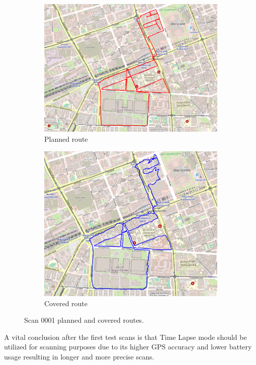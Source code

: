 \documentclass[a4paper,12pt]{article}
\begin{document}
\begin{enumerate}
\begin{figure}[H]
\begin{subfigure}{.88\textwidth}
			\includegraphics[width=1\linewidth]{route_p1}
			\caption{Planned route}
			\label{fig:a1}
		\end{subfigure}%
		\linebreak
		\begin{subfigure}{.88\textwidth}
			\centering
			\includegraphics[width=1\linewidth]{route_c1}
			\caption{Covered route}
			\label{fig:b1}
		\end{subfigure}
		\caption{Scan 0001 planned and covered routes.}
		\label{fig:fig1}
	\end{figure}
\end{enumerate}
A vital conclusion after the first test scans is that Time Lapse mode should be utilized for scanning purposes due to its higher GPS accuracy and lower battery usage resulting in longer and more precise scans.
\end{document}
